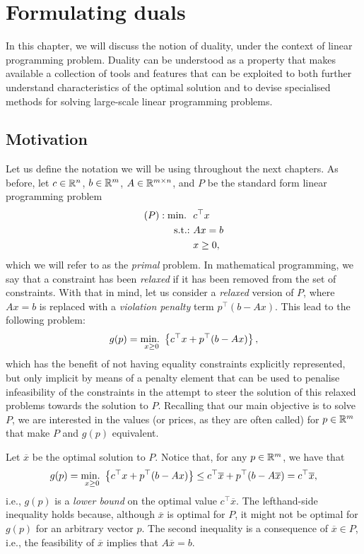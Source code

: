 \section{Formulating duals}

In this chapter, we will discuss the notion of duality, under the context of linear programming problem. Duality can be understood as a property that makes available a collection of tools and features that can be exploited to both further understand characteristics of the optimal solution and to devise specialised methods for solving large-scale linear programming problems.


\subsection{Motivation}

Let us define the notation we will be using throughout the next chapters. As before, let $c \in \mathbb{R}^n$, $b \in \mathbb{R}^m$, $A \in \mathbb{R}^{m \times n}$, and $P$ be the standard form linear programming problem
%
\begin{align*}
	(P) : \mathop{\text{min.~}} \ & c^\top x \\
	\mathop{\text{s.t.:~}} 	  & Ax = b \\
		  & x \geq 0,   
\end{align*}
%
which we will refer to as the \emph{primal} problem.  In mathematical programming, we say that a constraint has been \emph{relaxed} if it has been removed from the set of constraints. With that in mind, let us consider a \emph{relaxed} version of $P$, where $Ax = b$ is replaced with a \emph{violation penalty} term $p^\top (b - Ax)$. This lead to the following problem:
%
\begin{equation*}
	g(p) = \mathop{\text{min.~}}_{x \geq 0} \left\{ c^\top x + p^\top (b - Ax) \right \},
\end{equation*}
%
which has the benefit of not having equality constraints explicitly represented, but only implicit by means of a penalty element that can be used to penalise infeasibility of the constraints in the attempt to steer the solution of this relaxed problems towards the solution to $P$. Recalling that our main objective is to solve $P$, we are interested in the values (or prices, as they are often called) for $p \in \mathbb{R}^m$ that make $P$ and $g(p)$ equivalent.

Let $\overline{x}$ be the optimal solution to $P$. Notice that, for any $p \in \mathbb{R}^m$, we have that
%
\begin{equation*}
	g(p) = \mathop{\text{min.~}}_{x \geq 0} \left\{ c^\top x + p^\top (b - Ax) \right \} \leq c^\top \overline{x} +  p^\top (b - A\overline{x}) = c^\top \overline{x},   
\end{equation*}
%
i.e., $g(p)$ is a \emph{lower bound} on the optimal value $c^\top \overline{x}$. The lefthand-side inequality holds because, although $\overline{x}$ is optimal for $P$, it might not be optimal for $g(p)$ for an arbitrary vector $p$. The second inequality is a consequence of $\overline{x} \in P$, i.e., the feasibility of $\overline{x}$ implies that $A\overline{x} = b$.

